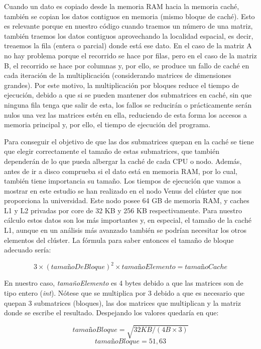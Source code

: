 \documentclass[a4paper,12pt]{article}
\begin{document}
Cuando un dato es copiado desde la memoria RAM hacia la memoria caché, también se copian los datos contiguos en memoria (mismo bloque de caché). Esto es relevante porque en nuestro código cuando traemos un número de una matriz, también traemos los datos contiguos aprovechando la localidad espacial, es decir, treaemos la fila (entera o parcial) donde está ese dato. En el caso de la matriz A no hay problema porque el recorrido se hace por filas, pero en el caso de la matriz B, el recorrido se hace por columnas y, por ello, se produce un fallo de caché en cada iteración de la multiplicación (considerando matrices de dimensiones grandes). Por este motivo, la multiplicación por bloques reduce el tiempo de ejecución, debido a que si se pueden mantener dos submatrices en caché, sin que ninguna fila tenga que salir de esta, los fallos se reducirán o prácticamente serán nulos una vez las matrices estén en ella, reduciendo de esta forma los accesos a memoria principal y, por ello, el tiempo de ejecución del programa.

Para conseguir el objetivo de que las dos submatrices quepan en la caché se tiene que elegir correctamente el tamaño de estas submatrices, que también dependerán de lo que pueda albergar la caché de cada CPU o nodo. Además, antes de ir a disco comprueba si el dato está en memoria RAM, por lo cual, también tiene importancia su tamaño. Los tiempos de ejecución que vamos a mostrar en este estudio se han realizado en el nodo Venus del clúster que nos proporciona la universidad. Este nodo posee 64 GB de memoria RAM, y caches L1 y L2 privadas por core de 32 KB y 256 KB respectivamente. Para nuestro cálculo estos datos son los más importantes y, en especial, el tamaño de la caché L1, aunque en un análisis más avanzado también se podrían necesitar los otros elementos del clúster. La fórmula para saber entonces el tamaño de bloque adecuado sería:

\begin{equation} \label{equ:cache}
 3 \times (tamañoDeBloque) ^ 2 \times tamañoElemento = tamañoCache
\end{equation}

En nuestro caso, {\it tamañoElemento} es 4 bytes debido a que las matrices son de tipo entero ({\it int}). Nótese que se multiplica por 3 debido a que es necesario que quepan 3 submatrices (bloques), las dos matrices que multiplican y la matriz donde se escribe el resultado. Despejando los valores quedaría en que:


\[tamañoBloque = \sqrt{32KB/(4B \times 3)}\]
\[tamañoBloque = 51,63\]
\end{document}
